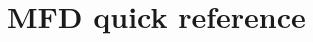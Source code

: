 \documentclass[Orbiter User Manual.tex]{subfiles}
\begin{document}
\section{MFD quick reference}

\end{document}
